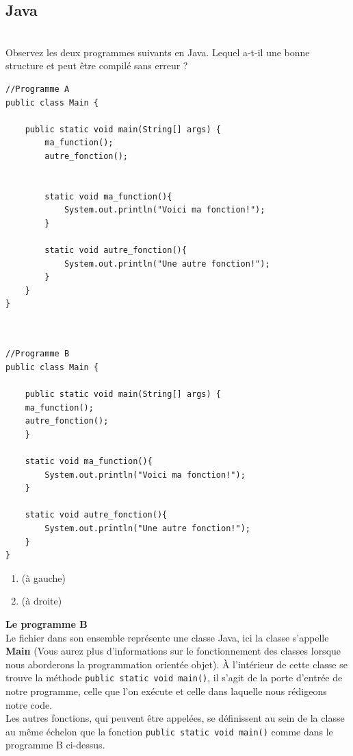 \subsection{Java}


\begin{Exercice}[3 minutes] \\
Observez les deux programmes suivants en Java. Lequel a-t-il une bonne structure et peut être compilé sans erreur ?

\begin{multicols}{2}
\begin{lstlisting}
//Programme A
public class Main {

    public static void main(String[] args) {
        ma_function();
        autre_fonction();
    

        static void ma_function(){
            System.out.println("Voici ma fonction!");
        }
    
        static void autre_fonction(){
            System.out.println("Une autre fonction!");
        }
    }
}



\end{lstlisting}
\columnbreak

\begin{lstlisting}
//Programme B
public class Main {

    public static void main(String[] args) {
    ma_function();
    autre_fonction();
    }

    static void ma_function(){
        System.out.println("Voici ma fonction!");
    }

    static void autre_fonction(){
        System.out.println("Une autre fonction!");
    }
}
\end{lstlisting}
\columnbreak

\end{multicols}
\begin{enumerate}[label=\Alph*]
    \item (à gauche)
    \item (à droite)
\end{enumerate}
\begin{solution}
    \textbf{Le programme B}\\
    Le fichier dans son ensemble représente une classe Java, ici la classe s'appelle \textbf{Main} (Vous aurez plus d'informations sur le fonctionnement des classes lorsque nous aborderons la programmation orientée objet). À l'intérieur de cette classe se trouve la méthode \lstinline{public static void main()}, il s'agit de la porte d'entrée de notre programme, celle que l'on exécute et celle dans laquelle nous rédigeons notre code.\\
    Les autres fonctions, qui peuvent être appelées, se définissent au sein de la classe au même échelon que la fonction \lstinline{public static void main()} comme dans le programme B ci-dessus. 
\end{solution}
\end{Exercice}

